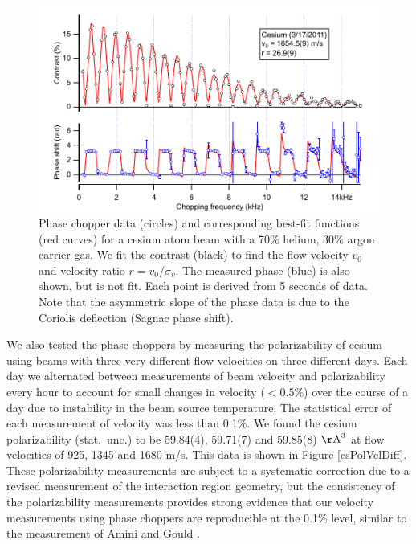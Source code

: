 \begin{figure}
\includegraphics[width=1\textwidth]{Figures/CsSimpleChopperScan.pdf}
\caption[Phase chopper data and best-fit functions.]{\label{CsSimpleChopperScan}Phase chopper data (circles) and corresponding best-fit functions (red curves) for a cesium atom beam with a 70\% helium, 30\% argon carrier gas. We fit the contrast (black) to find the flow velocity $v_0$ and velocity ratio $r=v_0/\sigma_v$. The measured phase (blue) is also shown, but is not fit. Each point is derived from 5 seconds of data. Note that the asymmetric slope of the phase data is due to the Coriolis deflection (Sagnac phase shift).}
\end{figure} 


We also tested the phase choppers by measuring the polarizability of cesium using beams with three very different flow velocities on three different days. Each day we alternated between measurements of beam velocity and polarizability every hour to account for small changes in velocity ($<0.5\%$) over the course of a day due to instability in the beam source temperature. The statistical error of each measurement of velocity was less than 0.1\%. We found the cesium polarizability (stat.~unc.) to be 59.84(4), 59.71(7) and 59.85(8) $\mathrm{\AA}^3$ at flow velocities of 925, 1345 and 1680 m/s. This data is shown in Figure \ref{csPolVelDiff}. These polarizability measurements are subject to a systematic correction due to a revised measurement of the interaction region geometry, but the consistency of the polarizability measurements provides strong evidence that our velocity measurements using phase choppers are reproducible at the 0.1\% level, similar to the measurement of Amini and Gould \cite{Ami03}.







